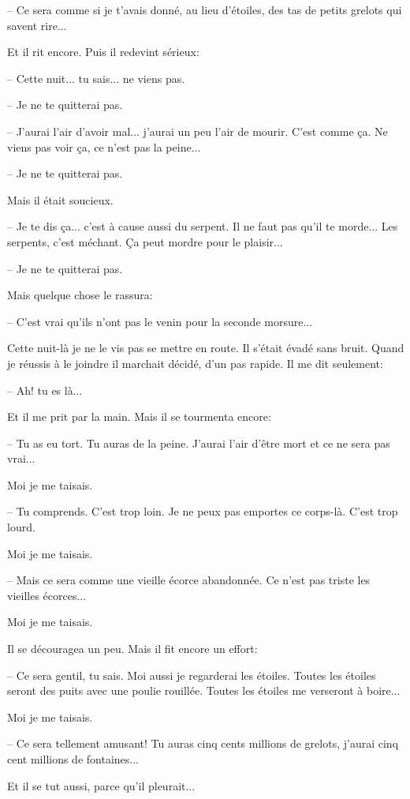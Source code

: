 \documentclass[a4paper]{report}
\begin{document}
-- Ce sera comme si je t'avais donné, au lieu d'étoiles, des tas de petits grelots qui savent rire...

Et il rit encore. Puis il redevint sérieux:

-- Cette nuit... tu sais... ne viens pas.

-- Je ne te quitterai pas.

-- J'aurai l'air d'avoir mal... j'aurai un peu l'air de mourir. C'est comme ça. Ne viens pas voir ça, ce n'est pas la peine...

-- Je ne te quitterai pas.

Mais il était soucieux.

-- Je te dis ça... c'est à cause aussi du serpent. Il ne faut pas qu'il te morde... Les serpents, c'est méchant. Ça peut mordre pour le plaisir...

-- Je ne te quitterai pas.

Mais quelque chose le rassura:

-- C'est vrai qu'ils n'ont pas le venin pour la seconde morsure...

Cette nuit-là je ne le vis pas se mettre en route. Il s'était évadé sans bruit. Quand je réussis à le joindre il marchait décidé, d'un pas rapide. Il me dit seulement:

-- Ah! tu es là...

Et il me prit par la main. Mais il se tourmenta encore:

-- Tu as eu tort. Tu auras de la peine. J'aurai l'air d'être mort et ce ne sera pas vrai...

Moi je me taisais.

-- Tu comprends. C'est trop loin. Je ne peux pas emportes ce corps-là. C'est trop lourd.

Moi je me taisais.

-- Mais ce sera comme une vieille écorce abandonnée. Ce n'est pas triste les vieilles écorces...

Moi je me taisais.

Il se découragea un peu. Mais il fit encore un effort:

-- Ce sera gentil, tu sais. Moi aussi je regarderai les étoiles. Toutes les étoiles seront des puits avec une poulie rouillée. Toutes les étoiles me verseront à boire...

Moi je me taisais.

-- Ce sera tellement amusant! Tu auras cinq cents millions de grelots, j'aurai cinq cent millions de fontaines...

Et il se tut aussi, parce qu'il pleurait...
\end{document}
